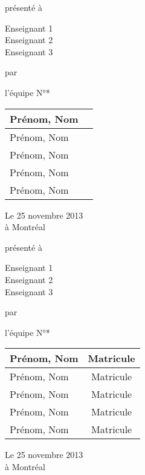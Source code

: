 
\begin{pagetitre}




présenté à

Enseignant 1\\
Enseignant 2\\
Enseignant 3

par 

l'équipe N°*

\vfill

\begin{tabular}{l c }
\hline 
\rule[0ex]{0pt}{2ex}Prénom, Nom&  \\ 
\hline
\rule[0ex]{0pt}{2ex}Prénom, Nom &  \\ 
\hline 
\rule[0ex]{0pt}{2ex}Prénom, Nom &  \\ 
\hline
\rule[0ex]{0pt}{2ex}Prénom, Nom &  \\ 
\hline 
\rule[0ex]{0pt}{2ex}Prénom, Nom & \hspace*{4cm} \\ 
\hline 
\end{tabular} 

Le 25 novembre 2013\\
à Montréal

\end{pagetitre}


\begin{pagetitre}




présenté à

Enseignant 1\\
Enseignant 2\\
Enseignant 3

par 

l'équipe N°*

\vfill
\begin{tabular}{|l|c|}
\hline 
\rule[0ex]{0pt}{2ex}Prénom, Nom & Matricule\\ 
\hline
\rule[0ex]{0pt}{2ex}Prénom, Nom & Matricule\\ 
\hline 
\rule[0ex]{0pt}{2ex}Prénom, Nom & Matricule \\ 
\hline
\rule[0ex]{0pt}{2ex}Prénom, Nom & Matricule \\ 
\hline 
\rule[0ex]{0pt}{2ex}Prénom, Nom & Matricule \\ 
\hline 
\end{tabular} 

Le 25 novembre 2013\\
à Montréal

\end{pagetitre}
